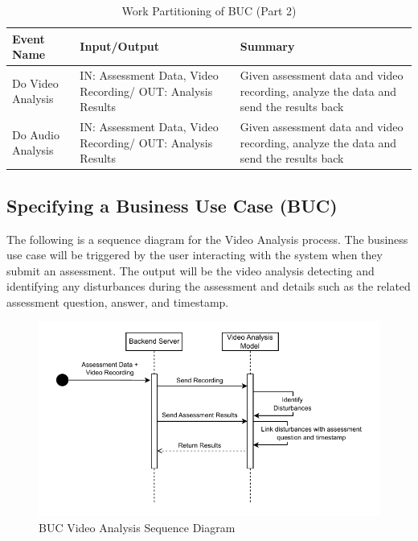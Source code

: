 \documentclass[12pt]{article}
\begin{document}
\begin{table}[H]
  \centering
  \caption{Work Partitioning of BUC (Part 2)}
  \label{tab:work_partition_2}
  \begin{tabularx}{1.2\textwidth} { 
     | >{\raggedright\arraybackslash}X 
     | >{\raggedright\arraybackslash}X 
     | >{\raggedright\arraybackslash}X | }
  \hline
  \textbf{Event Name} & \textbf{Input/Output} & \textbf{Summary} \\
  \hline
  Do Video Analysis & IN: Assessment Data, Video Recording/ OUT: Analysis Results  & Given assessment data and video recording, analyze the data and send the results back\\
  \hline
  Do Audio Analysis & IN: Assessment Data, Video Recording/ OUT: Analysis Results & Given assessment data and video recording, analyze the data and send the results back \\
  \hline
  \end{tabularx}
\end{table}

\subsection{Specifying a Business Use Case (BUC)}
\hspace{2em}The following is a sequence diagram for the Video Analysis process. The business use case will be triggered by the user interacting with the system 
when they submit an assessment. The output will be the video analysis detecting and identifying any disturbances during the 
assessment and details such as the related assessment question, answer, and timestamp.

\begin{figure}[H]
  \centering
  \includegraphics[scale=0.8]{images/BUC.pdf}
  \caption{BUC Video Analysis Sequence Diagram}
\end{figure}
\end{document}
